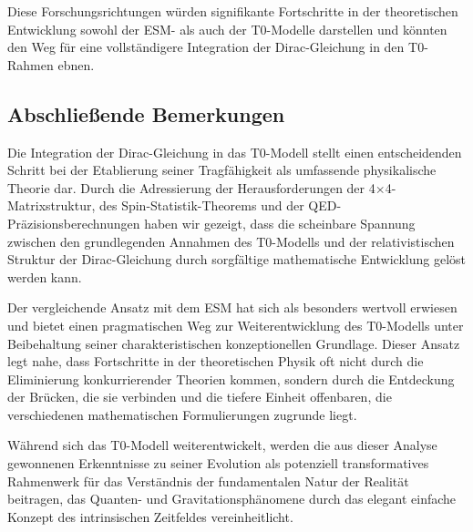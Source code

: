 \documentclass[12pt,a4paper]{article}
\begin{document}
	Diese Forschungsrichtungen würden signifikante Fortschritte in der theoretischen Entwicklung sowohl der ESM- als auch der T0-Modelle darstellen und könnten den Weg für eine vollständigere Integration der Dirac-Gleichung in den T0-Rahmen ebnen.
	
	\subsection{Abschließende Bemerkungen}
	\label{subsec:concluding_remarks}
	
	Die Integration der Dirac-Gleichung in das T0-Modell stellt einen entscheidenden Schritt bei der Etablierung seiner Tragfähigkeit als umfassende physikalische Theorie dar. Durch die Adressierung der Herausforderungen der 4$\times$4-Matrix\-struktur, des Spin-Statistik-Theorems und der QED-Präzisions\-berechnungen haben wir gezeigt, dass die scheinbare Spannung zwischen den grundlegenden Annahmen des T0-Modells und der relativistischen Struktur der Dirac-Gleichung durch sorgfältige mathematische Entwicklung gelöst werden kann.
	
	Der vergleichende Ansatz mit dem ESM hat sich als besonders wertvoll erwiesen und bietet einen pragmatischen Weg zur Weiterentwicklung des T0-Modells unter Beibehaltung seiner charakteristischen konzeptionellen Grundlage. Dieser Ansatz legt nahe, dass Fortschritte in der theoretischen Physik oft nicht durch die Eliminierung konkurrierender Theorien kommen, sondern durch die Entdeckung der Brücken, die sie verbinden und die tiefere Einheit offenbaren, die verschiedenen mathematischen Formulierungen zugrunde liegt.
	
	Während sich das T0-Modell weiterentwickelt, werden die aus dieser Analyse gewonnenen Erkenntnisse zu seiner Evolution als potenziell transformatives Rahmenwerk für das Verständnis der fundamentalen Natur der Realität beitragen, das Quanten- und Gravitationsphänomene durch das elegant einfache Konzept des intrinsischen Zeitfeldes vereinheitlicht.
	
\end{document}
